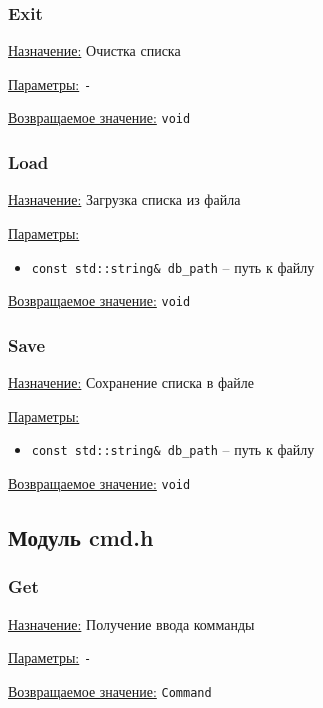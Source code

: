 \subsubsection*{Exit}

\underline{Назначение:} Очистка списка

\underline{Параметры:} \verb|-|

\underline{Возвращаемое значение:} \verb|void|


\subsubsection*{Load}

\underline{Назначение:} Загрузка списка из файла

\underline{Параметры:} 

\begin{itemize}
    \item \verb|const std::string& db_path| -- путь к файлу
\end{itemize}

\underline{Возвращаемое значение:} \verb|void|


\subsubsection*{Save}

\underline{Назначение:} Сохранение списка в файле

\underline{Параметры:} 

\begin{itemize}
    \item \verb|const std::string& db_path| -- путь к файлу
\end{itemize}

\underline{Возвращаемое значение:} \verb|void|


\subsection*{Модуль cmd.h}


\subsubsection*{Get}

\underline{Назначение:} Получение ввода комманды

\underline{Параметры:} \verb|-|

\underline{Возвращаемое значение:} \verb|Command|


